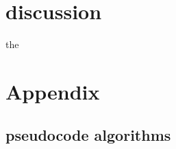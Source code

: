 \documentclass[letterpaper,10pt,english]{jupyterBook}
\begin{document}
\chapter{discussion}
\label{\detokenize{Discussion:discussion}}\label{\detokenize{Discussion::doc}}
\sphinxAtStartPar
the

\sphinxAtStartPar



\chapter{Appendix}
\label{\detokenize{Appendix:appendix}}\label{\detokenize{Appendix::doc}}

\section{pseudocode algorithms}
\label{\detokenize{Appendix:pseudocode-algorithms}}
\sphinxAtStartPar
{}

\sphinxAtStartPar
{}
\end{document}
